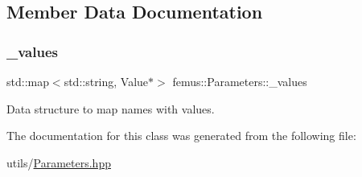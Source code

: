 \subsection{Member Data Documentation}
\mbox{\label{classfemus_1_1_parameters_a7cc0257d01c656db4d75122247e2dbf5}} 
\subsubsection{\texorpdfstring{\+\_\+values}{\_values}}
{\footnotesize\ttfamily std\+::map$<$std\+::string, Value$\ast$$>$ femus\+::\+Parameters\+::\+\_\+values\hspace{0.3cm}{\ttfamily [protected]}}

Data structure to map names with values. 

The documentation for this class was generated from the following file\+:\begin{DoxyCompactItemize}
\item 
utils/\mbox{\hyperlink{_parameters_8hpp}{Parameters.\+hpp}}\end{DoxyCompactItemize}
